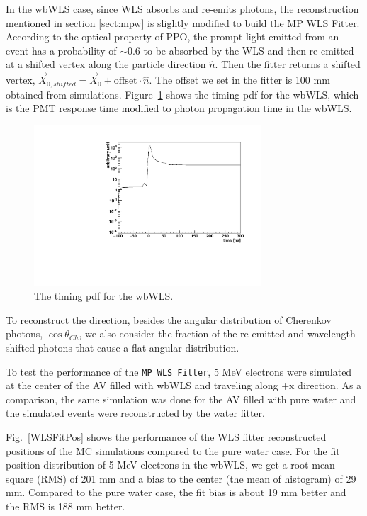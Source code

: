 In the wbWLS case, since WLS absorbs and re-emits photons, the reconstruction mentioned in section \ref{sect:mpw} is slightly modified to build the MP WLS Fitter. According to the optical property of PPO, the prompt light emitted from an event has a probability of $\sim$0.6 to be absorbed by the WLS and then re-emitted at a shifted vertex along the particle direction $\hat{n}$. Then the fitter returns a shifted vertex, $\vec{X}_{0,shifted}=\vec{X}_0+\mathrm{offset}\cdot\hat{n}$. The offset we set in the fitter is 100 mm obtained from simulations. Figure~\ref{WLS_pdf} shows the timing pdf for the wbWLS, which is the PMT response time modified to photon propagation time in the wbWLS.
\begin{figure}[htbp]	
	\centering		
	\begin{minipage}[b]{0.5\textwidth}			
		\includegraphics[height=6cm]{WLSTime_pdf.pdf}			
	\end{minipage}%
	\caption{\label{WLS_pdf} The timing pdf for the wbWLS.}	
\end{figure}

To reconstruct the direction, besides the angular distribution of Cherenkov photons, $\cos\theta_{Ch}$, we also consider the fraction of the re-emitted and wavelength shifted photons that cause a flat angular distribution.

To test the performance of the \texttt{MP WLS Fitter}, 5 MeV electrons were simulated at the center of the AV filled with wbWLS and traveling along +x direction. As a comparison, the same simulation was done for the AV filled with pure water and the simulated events were reconstructed by the water fitter.

Fig.~\ref{WLSFitPos} shows the performance of the WLS fitter reconstructed positions of the MC simulations compared to the pure water case. For the fit position distribution of 5 MeV electrons in the wbWLS, we get a root mean square (RMS) of 201 mm and a bias to the center (the mean of histogram) of 29 mm. Compared to the pure water case, the fit bias is about 19 mm better and the RMS is 188 mm better.

